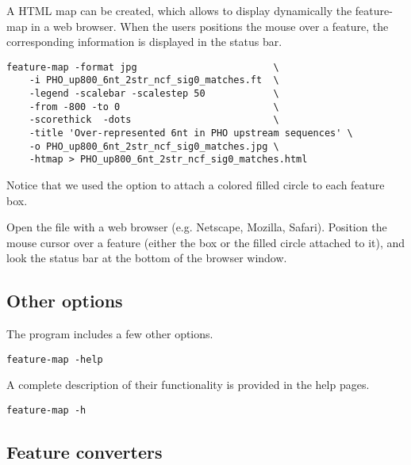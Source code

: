 A HTML map can be created, which allows to display dynamically the
feature-map in a web browser. When the users positions the mouse over
a feature, the corresponding information is displayed in the status
bar.

{\color{Blue} \begin{footnotesize} 
\begin{verbatim}
feature-map -format jpg                        \
    -i PHO_up800_6nt_2str_ncf_sig0_matches.ft  \
    -legend -scalebar -scalestep 50            \
    -from -800 -to 0                           \
    -scorethick  -dots                         \
    -title 'Over-represented 6nt in PHO upstream sequences' \
    -o PHO_up800_6nt_2str_ncf_sig0_matches.jpg \
    -htmap > PHO_up800_6nt_2str_ncf_sig0_matches.html
\end{verbatim} \end{footnotesize}
}

Notice that we used the option \option{-dot} to attach a colored filled 
circle to each feature box. 

Open the file 
with a web browser (e.g. Netscape, Mozilla, Safari). Position the
mouse cursor over a feature (either the box or the filled circle
attached to it), and look the status bar at the bottom of the browser
window.

\subsection{Other options}

The program \program{feature-map} includes a few other options.

{\color{Blue} \begin{footnotesize} 
\begin{verbatim}
feature-map -help
\end{verbatim} \end{footnotesize}
}

A complete description of their functionality is provided in 
the help pages.

{\color{Blue} \begin{footnotesize} 
\begin{verbatim}
feature-map -h
\end{verbatim} \end{footnotesize}
}

\subsection{Feature converters}

